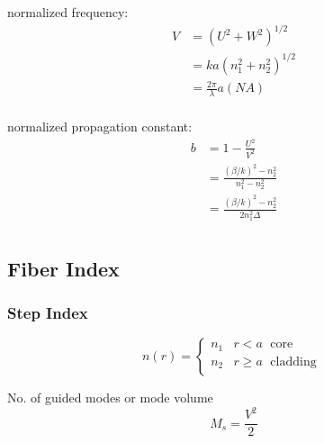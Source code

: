 \documentclass[12pt, onecolumn]{article}
\begin{document}
        normalized frequency:
        \begin{equation}
            \begin{aligned}
                V   &= \left(U^2 + W^2\right)^{1/2} \\
                    &= ka\left(n_1^2 + n_2^2\right)^{1/2} \\
                    &= \frac{2\pi}{\lambda}a(NA)\\
            \end{aligned}
        \end{equation}

        normalized propagation constant:
        \begin{equation}
            \begin{aligned}
                b   &= 1 - \displaystyle\frac{U^2}{V^2} \\
                    &= \displaystyle\frac{(\beta/k)^2 - n_2^2}{n_1^2 - n_2^2} \\
                    &= \displaystyle\frac{(\beta/k)^2 - n_2^2}{2n_1^2 \Delta} \\
            \end{aligned}
        \end{equation}
    
    \subsection{Fiber Index}
        \subsubsection{Step Index}
            \begin{equation}
                n(r) = 
                \begin{cases}
                    n_1 & r < a \; \text{ core } \\
                    n_2 & r \ge a \; \text{ cladding } \\                    
                \end{cases}
                \label{eq:step_index}
            \end{equation}

            No. of guided modes or mode volume
            \begin{equation}
                M_s = \frac{V^2}{2}
                \label{eq:mode_vol_s}
            \end{equation}
\end{document}
